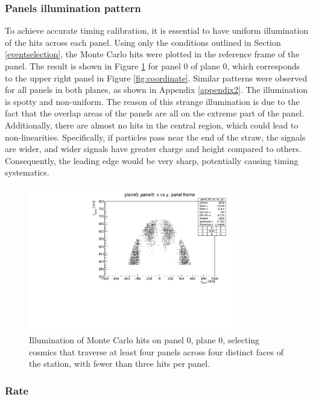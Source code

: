 \subsubsection{Panels illumination pattern}
To achieve accurate timing calibration, it is essential to have uniform illumination of the hits across each panel. 
Using only the conditions outlined in Section \ref{eventselection}, the Monte Carlo hits were plotted in the reference frame of the panel. 
The result is shown in Figure \ref{fig:illumination} for panel 0 of plane 0, which corresponds to the upper right panel in Figure 
\ref{fig:coordinate}. Similar patterns were observed for all panels in both planes, as shown in Appendix \ref{appendix2}. The illumination is 
spotty and non-uniform. The reason of this strange illumination is due to the fact that the overlap areas of the panels are all on the extreme part of the panel.
Additionally, there are almost no hits in the central region, which could lead to non-linearities. 
Specifically, if particles pass near the end of the straw, the signals are wider, and wider signals have greater charge and 
height compared to others. Consequently, the leading edge would be very sharp, potentially causing timing systematics.
\begin{figure}[!h]
    \centering
    \includegraphics[width =0.8\textwidth]{figures/pdf/xp_vs_yp_panel0.pdf}
    \caption{Illumination of Monte Carlo hits on panel 0, plane 0, selecting cosmics that traverse at 
    least four panels across four distinct faces of the station, with fewer than three hits per panel.}
    \label{fig:illumination}
\end{figure}
\subsubsection{Rate}
